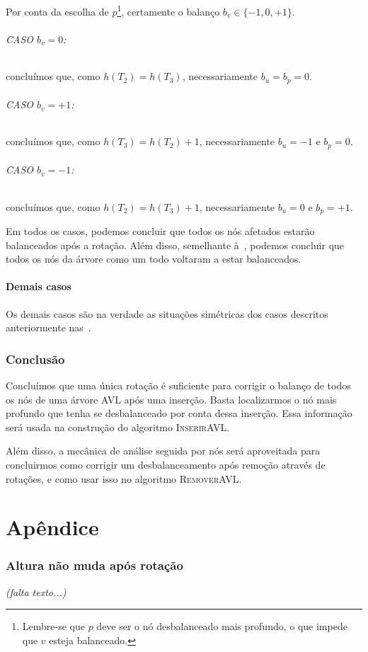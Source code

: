 \documentclass[11pt,twoside]{article}
\theoremstyle{definition}
\begin{document}
Por conta da escolha de \( p \)\footnote{Lembre-se que \( p \) deve ser o nó desbalanceado mais profundo, o que impede que \( v \) esteja balanceado.}, certamente o balanço \( b_v \in \{ -1, 0, +1 \} \).

\paragraph{CASO \( b_v = 0\):} concluímos que, como \( h(T_2) = h(T_3) \), necessariamente \( b_u = b_p = 0 \).

\paragraph{CASO \( b_v = +1\):} concluímos que, como \( h(T_3) = h(T_2) + 1 \), necessariamente \( b_u = -1 \) e \( b_p = 0 \).

\paragraph{CASO \( b_v = -1\):} concluímos que, como \( h(T_2) = h(T_3) + 1 \), necessariamente \( b_u = 0 \) e \( b_p = +1 \).

Em todos os casos, podemos concluir que todos os nós afetados estarão balanceados após a rotação. Além disso, semelhante à~, podemos concluir que todos os nós da árvore como um todo voltaram a estar balanceados.

\subsection{Demais casos}

Os demais casos são na verdade as situações simétricas dos casos descritos anteriormente nas~.

\section{Conclusão}

Concluímos que uma única rotação é suficiente para corrigir o balanço de todos os nós de uma árvore AVL após uma inserção. Basta localizarmos o nó mais profundo que tenha se desbalanceado por conta dessa inserção. Essa informação será usada na construção do algoritmo {\scshape InserirAVL}.

Além disso, a mecânica de análise seguida por nós será aproveitada para concluirmos como corrigir um desbalanceamento após remoção através de rotações, e como usar isso no algoritmo {\scshape RemoverAVL}.

\part*{Apêndice}

\section{Altura não muda após rotação}
\label{block:altura-nao-muda}
\emph{(falta texto...)} %


\end{document}
